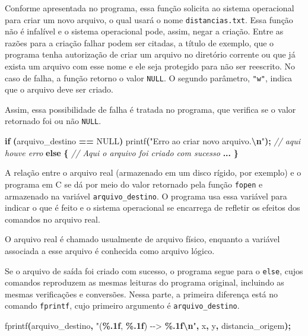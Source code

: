 \documentclass[
  11pt,
  a4paper,
]{scrbook}
\newenvironment{Shaded}{\begin{snugshade}}{\end{snugshade}}
\newcommand{\CommentTok}[1]{\textcolor[rgb]{0.56,0.35,0.01}{\textit{#1}}}
\newcommand{\ControlFlowTok}[1]{\textcolor[rgb]{0.13,0.29,0.53}{\textbf{#1}}}
\newcommand{\NormalTok}[1]{#1}
\newcommand{\OperatorTok}[1]{\textcolor[rgb]{0.81,0.36,0.00}{\textbf{#1}}}
\newcommand{\SpecialCharTok}[1]{\textcolor[rgb]{0.81,0.36,0.00}{\textbf{#1}}}
\newcommand{\StringTok}[1]{\textcolor[rgb]{0.31,0.60,0.02}{#1}}
\begin{document}
Conforme apresentada no programa, essa função solicita ao sistema
operacional para criar um novo arquivo, o qual usará o nome
\texttt{distancias.txt}. Essa função não é infalível e o sistema
operacional pode, assim, negar a criação. Entre as razões para a criação
falhar podem ser citadas, a título de exemplo, que o programa tenha
autorização de criar um arquivo no diretório corrente ou que já exista
um arquivo com esse nome e ele seja protegido para não ser reescrito. No
caso de falha, a função retorno o valor \texttt{NULL}. O segundo
parâmetro, \texttt{"w"}, indica que o arquivo deve ser criado.

Assim, essa possibilidade de falha é tratada no programa, que verifica
se o valor retornado foi ou não \texttt{NULL}.

\begin{Shaded}
\begin{Highlighting}[]
\ControlFlowTok{if} \OperatorTok{(}\NormalTok{arquivo\_destino }\OperatorTok{==}\NormalTok{ NULL}\OperatorTok{)}
\NormalTok{    printf}\OperatorTok{(}\StringTok{"Erro ao criar novo arquivo.}\SpecialCharTok{\textbackslash{}n}\StringTok{"}\OperatorTok{);}  \CommentTok{// aqui houve erro}
\ControlFlowTok{else} \OperatorTok{\{}
    \CommentTok{// Aqui o arquivo foi criado com sucesso}
    \OperatorTok{...}
\OperatorTok{\}}
\end{Highlighting}
\end{Shaded}

A relação entre o arquivo real (armazenado em um disco rígido, por
exemplo) e o programa em C se dá por meio do valor retornado pela função
\texttt{fopen} e armazenado na variável \texttt{arquivo\_destino}. O
programa usa essa variável para indicar o que é feito e o sistema
operacional se encarrega de refletir os efeitos dos comandos no arquivo
real.

  O arquivo real é chamado
usualmente de arquivo físico, enquanto a variável associada a esse
arquivo é conhecida como arquivo lógico.

Se o arquivo de saída foi criado com sucesso, o programa segue para o
\texttt{else}, cujos comandos reproduzem as mesmas leituras do programa
original, incluindo as mesmas verificações e conversões. Nessa parte, a
primeira diferença está no comando \texttt{fprintf}, cujo primeiro
argumento é \texttt{arquivo\_destino}.

\begin{Shaded}
\begin{Highlighting}[]
\NormalTok{fprintf}\OperatorTok{(}\NormalTok{arquivo\_destino}\OperatorTok{,} \StringTok{"(}\SpecialCharTok{\%.1f}\StringTok{, }\SpecialCharTok{\%.1f}\StringTok{) {-}{-}\textgreater{} }\SpecialCharTok{\%.1f\textbackslash{}n}\StringTok{"}\OperatorTok{,}\NormalTok{ x}\OperatorTok{,}\NormalTok{ y}\OperatorTok{,}\NormalTok{ distancia\_origem}\OperatorTok{);}
\end{Highlighting}
\end{Shaded}
\end{document}
